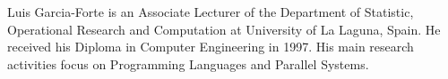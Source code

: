 Luis Garcia-Forte is an Associate Lecturer of the Department of Statistic, 
Operational Research and Computation at University of La Laguna,
Spain. He received his Diploma in Computer Engineering in 1997. 
His main research activities focus on Programming Languages and 
Parallel Systems. 
